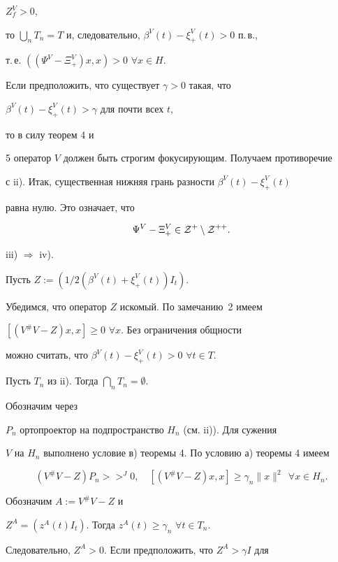 \begin{pf}
$Z_{f}^{V}{>}0$,


то $\bigcup\limits_{n}T_{n}=T$ и, следовательно, $\beta^{V}(t)-


\xi^{V}_{+}(t)>0$ п.\,в.,


т.\,е. $((\Psi^{V}-\Xi_{+}^{V})x,x)>0$ $\forall x\in H$. 


Если предположить, что существует $\gamma >0$ такая, что


$\beta^{V}(t)-\xi_{+}^{V}(t)>\gamma$ для почти всех $t$, 


то в силу теорем 4 и


5 оператор $V$ должен быть строгим фокусирующим. Получаем противоречие


с ii). Итак, существенная нижняя грань разности $\beta^{V}(t)-\xi_{+}^{V}(t)$


равна нулю. Это означает, что


$$


\Psi^{V}-\Xi_{+}^{V}\in {\cal Z}^{+}\setminus


{\cal Z}^{++}.


$$





iii) $\Rightarrow$ iv).


Пусть $Z:=(1/2(\beta^{V}(t)+\xi_{+}^{V}(t))I_{t})$.


Убедимся, что оператор $Z$ искомый. По замечанию~2 имеем


$[(V^{\#}V-Z)x,x]\geq 0$ $\forall x$. Без ограничения общности


можно считать, что $\beta^{V}(t)-\xi_{+}^{V}(t)>0$ $\forall t\in T$.


Пусть $T_{n}$ из ii). Тогда $\bigcap\limits_{n}T_{n}=\emptyset$.


Обозначим через


$P_{n}$ ортопроектор на подпространство $H_{n}$ (см. ii)). Для сужения


$V$ на $H_{n}$ выполнено условие в) теоремы 4. По условию а) теоремы 4 имеем


$$


(V^{\#}V-Z)P_{n}>>^{J}0,\quad


[(V^{\#}V-Z)x,x]\geq \gamma_{n}\| x\|^{2}\ \ \forall x\in H_{n}. 


$$


Обозначим $A:=V^{\#}V-Z$ и


$Z^{A}=(z^{A}(t)I_{t})$. Тогда $z^{A}(t)\geq\gamma_n$ $\forall t\in T_{n}$.


Следовательно, $Z^{A}>0$. Если предположить, что $Z^{A}>\gamma I$ для



\end{pf}
